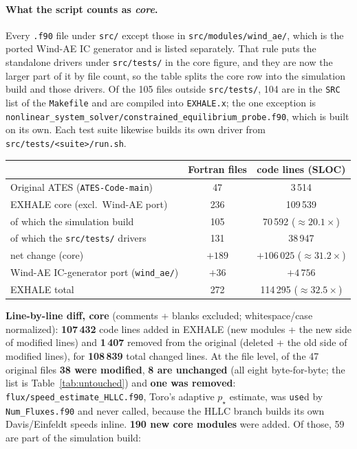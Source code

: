 \paragraph{What the script counts as \emph{core}.} Every \texttt{.f90} file
under \texttt{src/} except those in \texttt{src/modules/wind\_ae/}, which is
the ported Wind-AE IC generator and is listed separately. That rule puts the
standalone drivers under \texttt{src/tests/} in the core figure, and they are
now the larger part of it by file count, so the table splits the core row
into the simulation build and those drivers. Of the 105 files outside
\texttt{src/tests/}, 104 are in the \texttt{SRC} list of the \texttt{Makefile} and
are compiled into \texttt{EXHALE.x}; the one exception is
\texttt{nonlinear\_\allowbreak system\_\allowbreak solver/\allowbreak constrained\_\allowbreak equilibrium\_\allowbreak probe.f90},
which is built on its own. Each test suite likewise builds its own driver
from \texttt{src/tests/<suite>/run.sh}.

\begin{center}\small
\begin{tabular}{@{}lcc@{}}
\toprule
 & Fortran files & code lines (SLOC) \\
\midrule
Original ATES (\texttt{ATES-Code-main}) & 47 & 3\,514 \\
EXHALE core (excl.\ Wind-AE port)       & 236 & 109\,539 \\
\quad of which the simulation build     & 105 & 70\,592 ($\approx20.1\times$) \\
\quad of which the \texttt{src/tests/} drivers & 131 & 38\,947 \\
\midrule
net change (core) & $+189$ & $+106\,025$ ($\approx31.2\times$) \\
\midrule
Wind-AE IC-generator port (\texttt{wind\_ae/}) & $+36$ & $+4\,756$ \\
EXHALE total & 272 & 114\,295 ($\approx32.5\times$) \\
\bottomrule
\end{tabular}
\end{center}

\noindent
\textbf{Line-by-line diff, core} (comments + blanks excluded; whitespace/case
normalized): \textbf{107\,432} code lines added in EXHALE (new modules + the new
side of modified lines) and \textbf{1\,407} removed from the original (deleted + the
old side of modified lines), for \textbf{108\,839} total changed lines. At the file
level, of the 47 original files \textbf{38 were modified}, \textbf{8 are
unchanged} (all eight byte-for-byte; the list is Table~\ref{tab:untouched}) and
\textbf{one was removed}: \texttt{flux/\allowbreak speed\_\allowbreak estimate\_\allowbreak HLLC.f90}, Toro's
adaptive $p_\star$ estimate, was \texttt{use}d by \texttt{Num\_\allowbreak Fluxes.f90} and
never called, because the HLLC branch builds its own Davis/Einfeldt speeds
inline. \textbf{190 new core modules} were added. Of those, 59 are part of the
simulation build:

